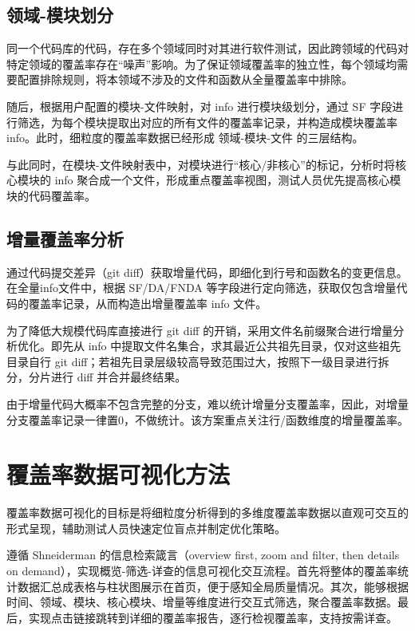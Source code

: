 \subsection{领域-模块划分}
    同一个代码库的代码，存在多个领域同时对其进行软件测试，因此跨领域的代码对特定领域的覆盖率存在“噪声”影响。为了保证领域覆盖率的独立性，每个领域均需要配置排除规则，将本领域不涉及的文件和函数从全量覆盖率中排除。
    
    随后，根据用户配置的模块-文件映射，对 info 进行模块级划分，通过 SF 字段进行筛选，为每个模块提取出对应的所有文件的覆盖率记录，并构造成模块覆盖率 info。此时，细粒度的覆盖率数据已经形成 领域-模块-文件 的三层结构。

    与此同时，在模块-文件映射表中，对模块进行“核心/非核心”的标记，分析时将核心模块的 info 聚合成一个文件，形成重点覆盖率视图，测试人员优先提高核心模块的代码覆盖率。

\subsection{增量覆盖率分析}
    通过代码提交差异（git diff）获取增量代码，即细化到行号和函数名的变更信息。在全量info文件中，根据 SF/DA/FNDA 等字段进行定向筛选，获取仅包含增量代码的覆盖率记录，从而构造出增量覆盖率 info 文件。

    为了降低大规模代码库直接进行 git diff 的开销，采用文件名前缀聚合进行增量分析优化。即先从 info 中提取文件名集合，求其最近公共祖先目录，仅对这些祖先目录自行 git diff；若祖先目录层级较高导致范围过大，按照下一级目录进行拆分，分片进行 diff 并合并最终结果。

    由于增量代码大概率不包含完整的分支，难以统计增量分支覆盖率，因此，对增量分支覆盖率记录一律置0，不做统计。该方案重点关注行/函数维度的增量覆盖率。


\section{覆盖率数据可视化方法}
    覆盖率数据可视化的目标是将细粒度分析得到的多维度覆盖率数据以直观可交互的形式呈现，辅助测试人员快速定位盲点并制定优化策略。

    遵循 Shneiderman 的信息检索箴言\cite{Shneiderman1996}（overview first, zoom and filter, then details on demand），实现概览-筛选-详查的信息可视化交互流程。首先将整体的覆盖率统计数据汇总成表格与柱状图展示在首页，便于感知全局质量情况。其次，能够根据时间、领域、模块、核心模块、增量等维度进行交互式筛选，聚合覆盖率数据。最后，实现点击链接跳转到详细的覆盖率报告，逐行检视覆盖率，支持按需详查。

